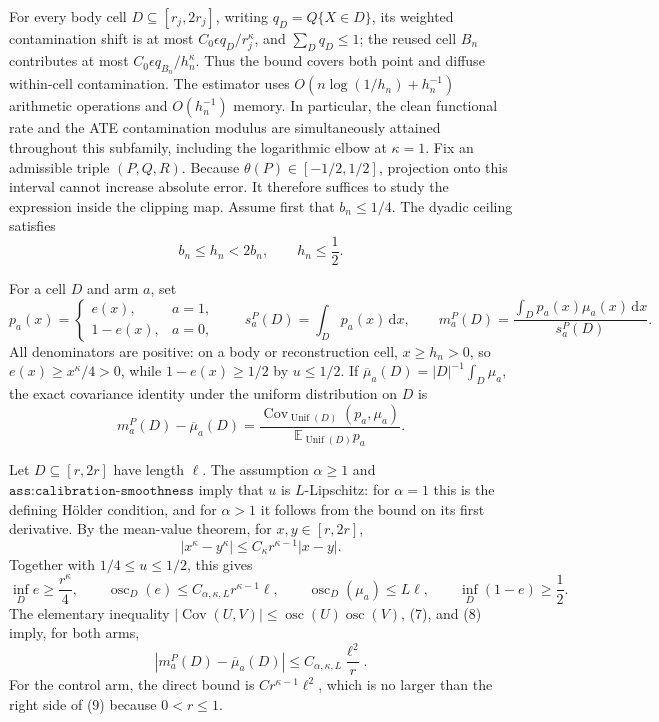 For every body cell \(D\subseteq[r_j,2r_j]\), writing \(q_D=Q\{X\in D\}\), its weighted contamination shift is at most \(C_0\epsilon q_D/r_j^\kappa\), and \(\sum_Dq_D\leq1\); the reused cell \(B_n\) contributes at most \(C_0\epsilon q_{B_n}/h_n^\kappa\). Thus the bound covers both point and diffuse within-cell contamination. The estimator uses \(O(n\log(1/h_n)+h_n^{-1})\) arithmetic operations and \(O(h_n^{-1})\) memory. In particular, the clean functional rate and the ATE contamination modulus are simultaneously attained throughout this subfamily, including the logarithmic elbow at \(\kappa=1\).
Fix an admissible triple \((P,Q,R)\). Because \(\theta(P)\in[-1/2,1/2]\), projection onto this interval cannot increase absolute error. It therefore suffices to study the expression inside the clipping map. Assume first that \(b_n\leq1/4\). The dyadic ceiling satisfies
\[
b_n\leq h_n<2b_n,
\qquad h_n\leq\frac12.
\tag{6}
\]

For a cell \(D\) and arm \(a\), set
\[
p_a(x)=
\begin{cases}e(x),&a=1,\\1-e(x),&a=0,\end{cases}
\qquad
s_a^P(D)=\int_Dp_a(x)\,\mathrm dx,
\qquad
m_a^P(D)=\frac{\int_Dp_a(x)\mu_a(x)\,\mathrm dx}{s_a^P(D)}.
\]
All denominators are positive: on a body or reconstruction cell, \(x\geq h_n>0\), so \(e(x)\geq x^\kappa/4>0\), while \(1-e(x)\geq1/2\) by \(u\leq1/2\). If \(\overline\mu_a(D)=|D|^{-1}\int_D\mu_a\), the exact covariance identity under the uniform distribution on \(D\) is
\[
m_a^P(D)-\overline\mu_a(D)
=\frac{\operatorname{Cov}_{\operatorname{Unif}(D)}(p_a,\mu_a)}
{\mathbb E_{\operatorname{Unif}(D)}p_a}.
\tag{7}
\]

Let \(D\subseteq[r,2r]\) have length \(\ell\). The assumption \(\alpha\geq1\) and \(\texttt{ass:calibration-smoothness}\) imply that \(u\) is \(L\)-Lipschitz: for \(\alpha=1\) this is the defining Hölder condition, and for \(\alpha>1\) it follows from the bound on its first derivative. By the mean-value theorem, for \(x,y\in[r,2r]\),
\[
|x^\kappa-y^\kappa|\leq C_\kappa r^{\kappa-1}|x-y|.
\]
Together with \(1/4\leq u\leq1/2\), this gives
\[
\inf_De\geq\frac{r^\kappa}{4},
\qquad
\operatorname{osc}_D(e)\leq C_{\alpha,\kappa,L}r^{\kappa-1}\ell,
\qquad
\operatorname{osc}_D(\mu_a)\leq L\ell,
\qquad
\inf_D(1-e)\geq\frac12.
\tag{8}
\]
The elementary inequality \(|\operatorname{Cov}(U,V)|\leq\operatorname{osc}(U)\operatorname{osc}(V)\), (7), and (8) imply, for both arms,
\[
|m_a^P(D)-\overline\mu_a(D)|
\leq C_{\alpha,\kappa,L}\frac{\ell^2}{r}.
\tag{9}
\]
For the control arm, the direct bound is \(C r^{\kappa-1}\ell^2\), which is no larger than the right side of (9) because \(0<r\leq1\).

